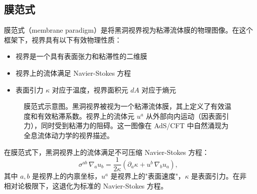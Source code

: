 \subsection{膜范式}

\begin{definition}[膜范式]\label{def:membrane-paradigm}
膜范式（membrane paradigm）是将黑洞视界视为粘滞流体膜的物理图像。在这个框架下，视界具有以下有效物理性质：
\begin{itemize}
    \item 视界是一个具有表面张力和粘滞性的二维膜
    \item 视界上的流体满足 Navier-Stokes 方程
    \item 表面引力 $\kappa$ 对应于温度，视界面积元 $dA$ 对应于熵元
\end{itemize}
\end{definition}

\begin{figure}[htbp]
\centering
{}
\caption{膜范式示意图。黑洞视界被视为一个粘滞流体膜，其上定义了有效温度和有效粘滞系数。视界上的流体元 $u^a$ 从外部向内运动（因表面引力），同时受到粘滞力的阻碍。这一图像在 AdS/CFT 中自然涌现为全息流体动力学的视界描述。}
\label{fig:membrane-paradigm}
\end{figure}

\begin{theorem}\label{thm:horizon-NS}
在膜范式下，黑洞视界上的流体满足不可压缩 Navier-Stokes 方程：
\begin{equation}\label{eq:membrane-NS}
    \sigma^{ab}\,\nabla_a u_b = \frac{1}{2\kappa}\left(\partial_a \kappa + u^b\,\nabla_b u_a\right),
\end{equation}
其中 $a,b$ 是视界上的内禀坐标，$u^a$ 是视界上的"表面速度"，$\kappa$ 是表面引力。在非相对论极限下，这退化为标准的 Navier-Stokes 方程。
\end{theorem}


